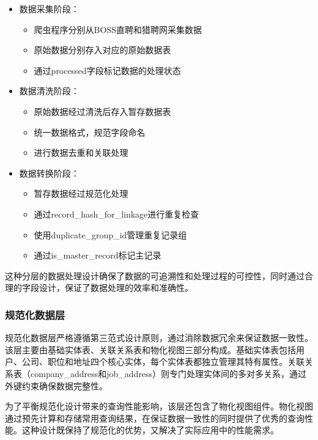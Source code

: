 \begin{itemize}
    \item 数据采集阶段：
    \begin{itemize}
        \item 爬虫程序分别从BOSS直聘和猎聘网采集数据
        \item 原始数据分别存入对应的原始数据表
        \item 通过processed字段标记数据的处理状态
    \end{itemize}
    
    \item 数据清洗阶段：
    \begin{itemize}
        \item 原始数据经过清洗后存入暂存数据表
        \item 统一数据格式，规范字段命名
        \item 进行数据去重和关联处理
    \end{itemize}
    
    \item 数据转换阶段：
    \begin{itemize}
        \item 暂存数据经过规范化处理
        \item 通过record\_hash\_for\_linkage进行重复检查
        \item 使用duplicate\_group\_id管理重复记录组
        \item 通过is\_master\_record标记主记录
    \end{itemize}
\end{itemize}

这种分层的数据处理设计确保了数据的可追溯性和处理过程的可控性，同时通过合理的字段设计，保证了数据处理的效率和准确性。

\subsubsection{规范化数据层}
规范化数据层严格遵循第三范式设计原则，通过消除数据冗余来保证数据一致性。该层主要由基础实体表、关联关系表和物化视图三部分构成。基础实体表包括用户、公司、职位和地址四个核心实体，每个实体表都独立管理其特有属性。关联关系表（company\_address和job\_address）则专门处理实体间的多对多关系，通过外键约束确保数据完整性。

为了平衡规范化设计带来的查询性能影响，该层还包含了物化视图组件。物化视图通过预先计算和存储常用查询结果，在保证数据一致性的同时提供了优秀的查询性能。这种设计既保持了规范化的优势，又解决了实际应用中的性能需求。

